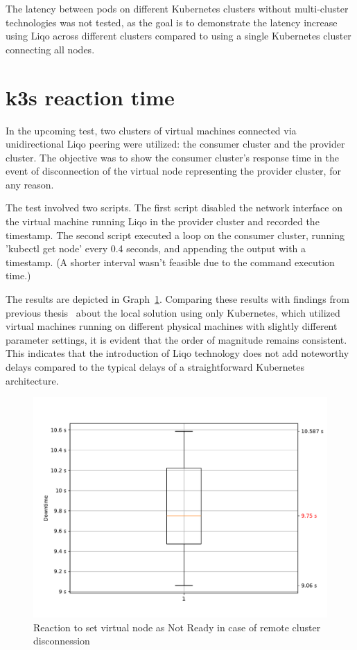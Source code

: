 The latency between pods on different Kubernetes clusters without multi-cluster technologies was not tested, as the goal is to demonstrate the latency increase using Liqo across different clusters compared to using a single Kubernetes cluster connecting all nodes.

\section{k3s reaction time}

In the upcoming test, two clusters of virtual machines connected via unidirectional Liqo peering were utilized: the consumer cluster and the provider cluster. The objective was to show the consumer cluster's response time in the event of disconnection of the virtual node representing the provider cluster, for any reason.

The test involved two scripts. The first script disabled the network interface on the virtual machine running Liqo in the provider cluster and recorded the timestamp. The second script executed a loop on the consumer cluster, running 'kubectl get node' every 0.4 seconds, and appending the output with a timestamp. (A shorter interval wasn't feasible due to the command execution time.)

The results are depicted in Graph~\ref{graph:k-reaction}. Comparing these results with findings from previous thesis~\cite{e3-1} about the local solution using only Kubernetes, which utilized virtual machines running on different physical machines with slightly different parameter settings, it is evident that the order of magnitude remains consistent. This indicates that the introduction of Liqo technology does not add noteworthy delays compared to the typical delays of a straightforward Kubernetes architecture.

\begin{figure}[ht]\centering
\includegraphics[scale=0.4]{Pictures/k3s-reaction}
\caption{Reaction to set virtual node as Not Ready in case of remote cluster disconnession}\label{graph:k-reaction}
\end{figure}

